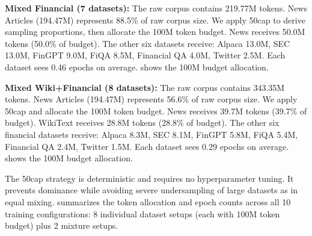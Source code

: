 \textbf{Mixed Financial (7 datasets):} The raw corpus contains 219.77M tokens. News Articles (194.47M) represents 88.5\% of raw corpus size. We apply 50cap to derive sampling proportions, then allocate the 100M token budget. News receives 50.0M tokens (50.0\% of budget). The other six datasets receive: Alpaca 13.0M, SEC 13.0M, FinGPT 9.0M, FiQA 8.5M, Financial QA 4.0M, Twitter 2.5M. Each dataset sees 0.46 epochs on average.  shows the 100M budget allocation.

\textbf{Mixed Wiki+Financial (8 datasets):} The raw corpus contains 343.35M tokens. News Articles (194.47M) represents 56.6\% of raw corpus size. We apply 50cap and allocate the 100M token budget. News receives 39.7M tokens (39.7\% of budget). WikiText receives 28.8M tokens (28.8\% of budget). The other six financial datasets receive: Alpaca 8.3M, SEC 8.1M, FinGPT 5.8M, FiQA 5.4M, Financial QA 2.4M, Twitter 1.5M. Each dataset sees 0.29 epochs on average.  shows the 100M budget allocation.

The 50cap strategy is deterministic and requires no hyperparameter tuning. It prevents dominance while avoiding severe undersampling of large datasets as in equal mixing.  summarizes the token allocation and epoch counts across all 10 training configurations: 8 individual dataset setups (each with 100M token budget) plus 2 mixture setups.

\begin{table}[htbp]
\centering
\caption[Training Token Allocation]{Training token allocation and epoch counts across all experimental setups. Individual training: each dataset receives full 100M budget. Mixtures: 100M budget distributed via 50cap strategy. Epoch counts vary inversely with dataset size.}
\label{tab:training_allocation}
\small
{}
\end{table}

